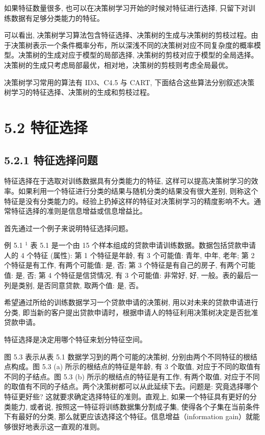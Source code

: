 \documentclass[10pt]{article}
\begin{document}
\begin{CJK*}{UTF8}{bsmi}
如果特征数量很多, 也可以在决策树学习开始的时候对特征进行选择, 只留下对训练数据有足够分类能力的特征。

可以看出, 决策树学习算法包含特征选择、决策树的生成与决策树的剪枝过程。由于决策树表示一个条件概率分布，所以深浅不同的决策树对应不同复杂度的概率模型。决策树的生成对应于模型的局部选择, 决策树的剪枝对应于模型的全局选择。决策树的生成只考虑局部最优，相对地，决策树的剪枝则考虑全局最优。

决策树学习常用的算法有 ID3、C4.5 与 CART, 下面结合这些算法分别叙述决策树学习的特征选择、决策树的生成和剪枝过程。

\section*{5.2 特征选择}
\subsection*{5.2.1 特征选择问题}
特征选择在于选取对训练数据具有分类能力的特征, 这样可以提高决策树学习的效率。如果利用一个特征进行分类的结果与随机分类的结果没有很大差别, 则称这个特征是没有分类能力的。经验上扔掉这样的特征对决策树学习的精度影响不大。通常特征选择的准则是信息增益或信息增益比。

首先通过一个例子来说明特征选择问题。

例 5.1 ${ }^{1}$ 表 5.1 是一个由 15 个样本组成的贷款申请训练数据。数据包括贷款申请人的 4 个特征 (属性): 第 1 个特征是年龄, 有 3 个可能值: 青年, 中年, 老年; 第 2 个特征是有工作, 有两个可能值: 是, 否; 第 3 个特征是有自己的房子, 有两个可能值: 是, 否; 第 4 个特征是信贷情况, 有 3 个可能值: 非常好, 好, 一般。表的最后一列是类别, 是否同意贷款, 取两个值: 是, 否。

希望通过所给的训练数据学习一个贷款申请的决策树, 用以对未来的贷款申请进行分类, 即当新的客户提出贷款申请时，根据申请人的特征利用决策树决定是否批准贷款申请。

特征选择是决定用哪个特征来划分特征空间。

图 5.3 表示从表 5.1 数据学习到的两个可能的决策树, 分别由两个不同特征的根结点构成。图 5.3 (a) 所示的根结点的特征是年龄, 有 3 个取值, 对应于不同的取值有不同的子结点。图 5.3 (b) 所示的根结点的特征是有工作, 有两个取值, 对应于不同的取值有不同的子结点。两个决策树都可以从此延续下去。问题是: 究竟选择哪个特征更好些? 这就要求确定选择特征的准则。直观上, 如果一个特征具有更好的分类能力, 或者说, 按照这一特征将训练数据集分割成子集, 使得各个子集在当前条件下有最好的分类, 那么就更应该选择这个特征。信息增益（information gain）就能够很好地表示这一直观的准则。


\end{CJK*}
\end{document}
